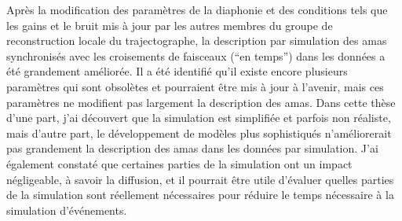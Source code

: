 
Après la modification des paramètres de la diaphonie et des conditions tels que les gains et le bruit mis à jour par les autres membres du groupe de reconstruction locale du trajectographe, la description par simulation des amas synchronisés avec les croisements de faisceaux (``en temps'') dans les données a été grandement améliorée. Il a été identifié qu'il existe encore plusieurs paramètres qui sont obsolètes et pourraient être mis à jour à l'avenir, mais ces paramètres ne modifient pas largement la description des amas. Dans cette thèse d'une part, j'ai découvert que la simulation est simplifiée et parfois non réaliste, mais d'autre part, le développement de modèles plus sophistiqués n'améliorerait pas grandement la description des amas dans les données par simulation. J'ai également constaté que certaines parties de la simulation ont un impact négligeable, à savoir la diffusion, et il pourrait être utile d'évaluer quelles parties de la simulation sont réellement nécessaires pour réduire le temps nécessaire à la simulation d'événements.


